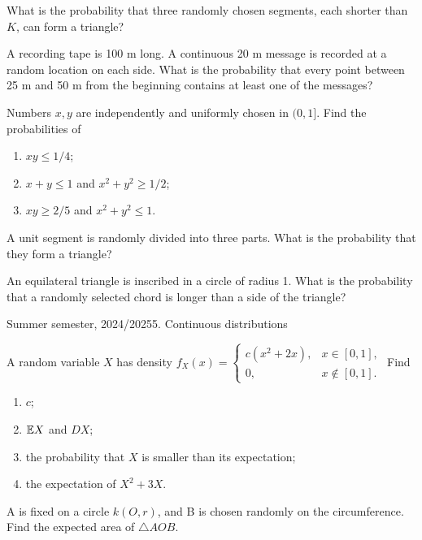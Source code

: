 \documentclass[a4paper]{report}
\begin{document}
\begin{problembook}
What is the probability that three randomly chosen segments, each shorter than $K$, can form a triangle?
\end{problembook}
\begin{problem}
A recording tape is 100 m long. A continuous 20 m message is recorded at a random location on each side. What is the probability that every point between 25 m and 50 m from the beginning contains at least one of the messages?
\end{problem}
\begin{problembook}
Numbers $x,y$ are independently and uniformly chosen in $(0,1]$. Find the probabilities of
\begin{enumerate}
\item $xy\le1/4$;
\item $x+y\le1$ and $x^2+y^2\ge1/2$;
\item $xy\ge2/5$ and $x^2+y^2\le1$.
\end{enumerate}
\end{problembook}
\begin{problembook}A unit segment is randomly divided into three parts. What is the probability that they form a triangle?\end{problembook}
\begin{probleminteresting}
An equilateral triangle is inscribed in a circle of radius 1. What is the probability that a randomly selected chord is longer than a side of the triangle?
\end{probleminteresting}
\pagebreak
\noindent Summer semester, 2024/2025\hfill 5. Continuous distributions
\par\noindent\hrulefill\par
\begin{problembook}
A random variable $X$ has density $f_X(x)=\begin{cases}c(x^2+2x),&x\in[0,1],\\0,&x\notin[0,1].\end{cases}$ Find
\begin{enumerate}\item $c$;\item $\mathbb {E} X$ and $DX$;\item the probability that $X$ is smaller than its expectation;\item the expectation of $X^2+3X$.\end{enumerate}
\end{problembook}
\begin{problembook}
A is fixed on a circle $k(O,r)$, and B is chosen randomly on the circumference. Find the expected area of $\triangle AOB$.
\end{problembook}
\end{document}
